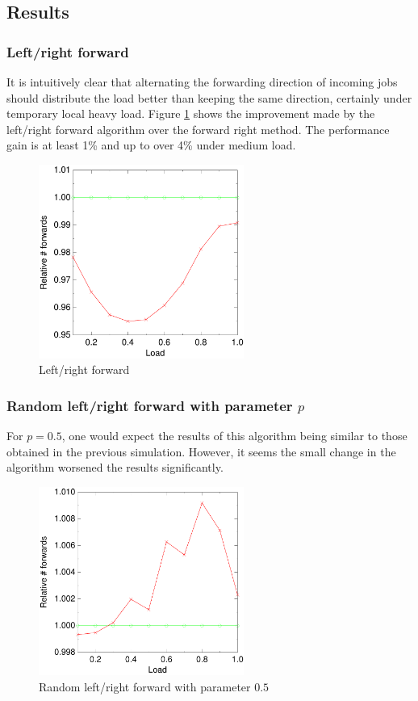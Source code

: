 \documentclass[10pt,a4paper]{article}
\begin{document}
\subsection{Results}
\label{simresults}

\subsubsection*{Left/right forward}
It is intuitively clear that alternating the forwarding direction of incoming jobs should distribute the load better than keeping the same direction, certainly under temporary local heavy load. Figure \ref{figlr} shows the improvement made by the left/right forward algorithm over the forward right method. The performance gain is at least 1\% and up to over 4\% under medium load.

\begin{figure}[h!tb]
\centering
\includegraphics[width=0.6\textwidth]{data/switchright.pdf}
\caption{Left/right forward}
\label{figlr}
\end{figure}


\subsubsection*{Random left/right forward with parameter $p$}
For $p=0.5$, one would expect the results of this algorithm being similar to those obtained in the previous simulation. However, it seems the small change in the algorithm worsened the results significantly.

\begin{figure}[h!tb]
\centering
\includegraphics[width=0.6\textwidth]{data/randswitchright.pdf}
\caption{Random left/right forward with parameter $0.5$}
\label{figrandswitch}
\end{figure}
\end{document}
